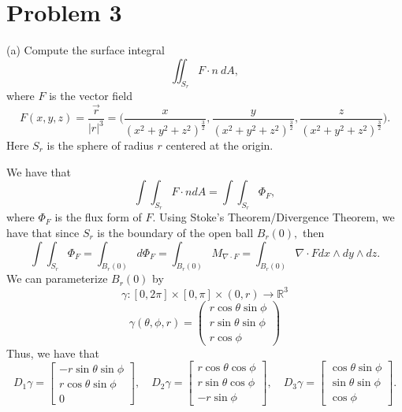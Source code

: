 \documentclass[11pt]{article}
\newcommand{\bbR}{\mathbb{R}}
\begin{document}
\newpage
\section*{Problem 3}
\begin{itemize}
\begin{problem}
\item[(a)] Compute the surface integral \[\iint_{S_r}F\cdot n\:dA,\] where $F$ is
the vector field
\begin{equation*}
F(x,y,z)=\frac{\vec{r}}{|r|^3}=\bigg(\frac{x}{(x^2+y^2+z^2)^\frac{3}{2}},\frac{y}
{(x^2+y^2+z^2)^\frac{3}{2}},\frac{z}{(x^2+y^2+z^2)^\frac{3}{2}}\bigg).
\end{equation*}
Here $S_r$ is the sphere of radius $r$ centered at the origin.
\end{problem}
\begin{solution}
    We have that 
    \[\int\int_{S_r} F \cdot n dA = \int \int_{S_r}\Phi_F,\] where $\Phi_F$ is the flux form of $F.$ Using Stoke's Theorem/Divergence Theorem, we have that since $S_r$ is the boundary of the open ball $B_r(0),$ then 
    \[\int \int_{S_r}\Phi_F = \int_{B_r(0)}d\Phi_F = \int_{B_r(0)} M_{\nabla \cdot F} = \int_{B_r(0)}\nabla \cdot F dx \wedge dy \wedge dz.\] We can parameterize $B_r(0)$ by 
    \[\gamma: [0,2\pi]\times [0,\pi]\times (0,r) \to \bbR^3\]
    \[\gamma(\theta,\phi, r) = \begin{pmatrix}
        r\cos\theta \sin\phi\\
        r\sin\theta \sin\phi\\
        r\cos\phi
    \end{pmatrix}\]
    Thus, we have that 
    \[D_1\gamma = \begin{bmatrix}
        -r\sin\theta\sin\phi\\
        r\cos\theta\sin\phi\\
        0
    \end{bmatrix}, \quad D_2\gamma = \begin{bmatrix}
        r\cos\theta\cos\phi\\
        r\sin\theta\cos\phi\\
        -r\sin\phi
    \end{bmatrix}, \quad D_3\gamma =  \begin{bmatrix}
        \cos\theta \sin\phi\\
        \sin\theta \sin\phi\\
        \cos\phi
    \end{bmatrix}.\] 
    

\end{solution}
\end{itemize}
\end{document}
